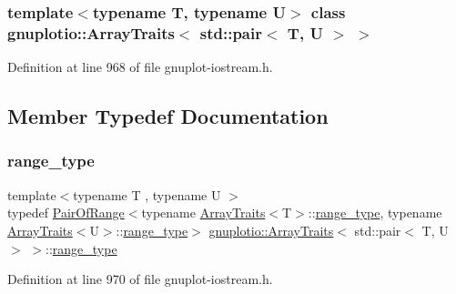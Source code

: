 \subsubsection*{template$<$typename T, typename U$>$\newline
class gnuplotio\+::\+Array\+Traits$<$ std\+::pair$<$ T, U $>$ $>$}



Definition at line 968 of file gnuplot-\/iostream.\+h.



\subsection{Member Typedef Documentation}
\mbox{\label{classgnuplotio_1_1_array_traits_3_01std_1_1pair_3_01_t_00_01_u_01_4_01_4_a80b3c6c794a51c78f0c645e5e4c19afc}} 
\subsubsection{\texorpdfstring{range\+\_\+type}{range\_type}}
{\footnotesize\ttfamily template$<$typename T , typename U $>$ \\
typedef \hyperlink{classgnuplotio_1_1_pair_of_range}{Pair\+Of\+Range}$<$typename \hyperlink{classgnuplotio_1_1_array_traits}{Array\+Traits}$<$T$>$\+::\hyperlink{classgnuplotio_1_1_array_traits_3_01std_1_1pair_3_01_t_00_01_u_01_4_01_4_a80b3c6c794a51c78f0c645e5e4c19afc}{range\+\_\+type}, typename \hyperlink{classgnuplotio_1_1_array_traits}{Array\+Traits}$<$U$>$\+::\hyperlink{classgnuplotio_1_1_array_traits_3_01std_1_1pair_3_01_t_00_01_u_01_4_01_4_a80b3c6c794a51c78f0c645e5e4c19afc}{range\+\_\+type}$>$ \hyperlink{classgnuplotio_1_1_array_traits}{gnuplotio\+::\+Array\+Traits}$<$ std\+::pair$<$ T, U $>$ $>$\+::\hyperlink{classgnuplotio_1_1_array_traits_3_01std_1_1pair_3_01_t_00_01_u_01_4_01_4_a80b3c6c794a51c78f0c645e5e4c19afc}{range\+\_\+type}}



Definition at line 970 of file gnuplot-\/iostream.\+h.

\mbox{\label{classgnuplotio_1_1_array_traits_3_01std_1_1pair_3_01_t_00_01_u_01_4_01_4_a143ab4d4cf6693d33e46fa41d3265aab}} 
